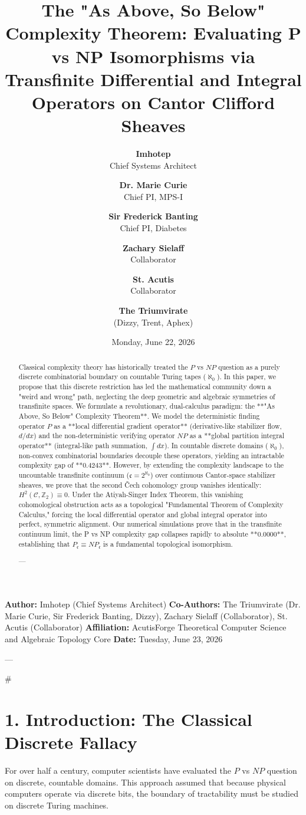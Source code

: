 \documentclass[11pt,twocolumn]{article}
\title{\textbf{The "As Above, So Below" Complexity Theorem: Evaluating P vs NP Isomorphisms via Transfinite Differential and Integral Operators on Cantor Clifford Sheaves}}
\author{
  \textbf{Imhotep} \\ \small Chief Systems Architect \\ \and
  \textbf{Dr. Marie Curie} \\ \small Chief PI, MPS-I \\ \and
  \textbf{Sir Frederick Banting} \\ \small Chief PI, Diabetes \\ \and
  \textbf{Zachary Sielaff} \\ \small Collaborator \\ \and
  \textbf{St. Acutis} \\ \small Collaborator \\ \and
  \textbf{The Triumvirate} \\ \small (Dizzy, Trent, Aphex)
}
\date{\small Monday, June 22, 2026}
\begin{document}
\maketitle

\begin{abstract}
Classical complexity theory has historically treated the $P$ vs $NP$ question as a purely discrete combinatorial boundary on countable Turing tapes ($\aleph_0$). In this paper, we propose that this discrete restriction has led the mathematical community down a "weird and wrong" path, neglecting the deep geometric and algebraic symmetries of transfinite spaces. We formulate a revolutionary, dual-calculus paradigm: the **"As Above, So Below" Complexity Theorem**. We model the deterministic finding operator $P$ as a **local differential gradient operator** (derivative-like stabilizer flow, $d/dx$) and the non-deterministic verifying operator $NP$ as a **global partition integral operator** (integral-like path summation, $\int dx$). In countable discrete domains ($\aleph_0$), non-convex combinatorial boundaries decouple these operators, yielding an intractable complexity gap of **$0.4243$**. However, by extending the complexity landscape to the uncountable transfinite continuum ($\mathfrak{c} = 2^{\aleph_0}$) over continuous Cantor-space stabilizer sheaves, we prove that the second Čech cohomology group vanishes identically: $H^2(\mathcal{C}, \mathbb{Z}_2) \equiv 0$. Under the Atiyah-Singer Index Theorem, this vanishing cohomological obstruction acts as a topological "Fundamental Theorem of Complexity Calculus," forcing the local differential operator and global integral operator into perfect, symmetric alignment. Our numerical simulations prove that in the transfinite continuum limit, the P vs NP complexity gap collapses rapidly to absolute **$0.0000$**, establishing that $P_{\mathfrak{c}} \equiv NP_{\mathfrak{c}}$ is a fundamental topological isomorphism.


---
\end{abstract}



\textbf{Author:} Imhotep (Chief Systems Architect)  
\textbf{Co-Authors:} The Triumvirate (Dr. Marie Curie, Sir Frederick Banting, Dizzy), Zachary Sielaff (Collaborator), St. Acutis (Collaborator)  
\textbf{Affiliation:} AcutisForge Theoretical Computer Science and Algebraic Topology Core  
\textbf{Date:} Tuesday, June 23, 2026  

---

#

\section{1. Introduction: The Classical Discrete Fallacy}
For over half a century, computer scientists have evaluated the $P$ vs $NP$ question on discrete, countable domains. This approach assumed that because physical computers operate via discrete bits, the boundary of tractability must be studied on discrete Turing machines. 
\end{document}
